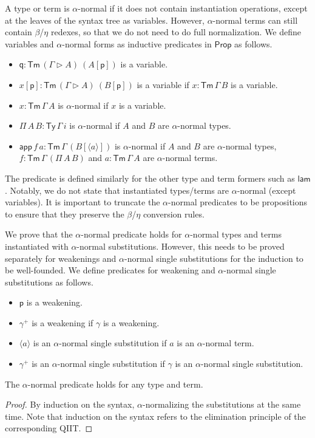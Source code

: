 \documentclass[sigplan,10pt,anonymous,review]{acmart}\settopmatter{printfolios=true,printccs=false,printacmref=false}
\newcommand{\Prop}{\mathsf{Prop}}
\newcommand{\Ty}{\mathsf{Ty}}
\newcommand{\Tm}{\mathsf{Tm}}
\newcommand{\p}{\mathsf{p}}
\newcommand{\q}{\mathsf{q}}
\newcommand{\ext}{\mathop{\triangleright}}
\newcommand{\lam}{\mathsf{lam}}
\newcommand{\app}{\mathsf{app}}
\begin{document}
A type or term is $\alpha$-normal if it does not contain instantiation
operations, except at the leaves of the syntax tree as variables. However,
$\alpha$-normal terms can still contain $\beta$/$\eta$ redexes, so that we do
not need to do full normalization. We define variables and $\alpha$-normal forms
as inductive predicates in $\Prop$ as follows.
\begin{itemize}
  \item $\q:\Tm\,(\Gamma\ext A)\ (A[\p])$ is a variable.
  \item $x[\p]:\Tm\,(\Gamma\ext A)\ (B[\p])$ is a variable if $x:\Tm\,\Gamma\,B$
  is a variable.
  \item $x:\Tm\,\Gamma\,A$ is $\alpha$-normal if $x$ is a variable.
  \item $\Pi\,A\,B:\Ty\,\Gamma\,i$ is $\alpha$-normal if $A$ and $B$ are
  $\alpha$-normal types.
  \item $\app\,f\,a:\Tm\,\Gamma\,(B[\langle a \rangle])$ is $\alpha$-normal if
  $A$ and $B$ are $\alpha$-normal types, $f:\Tm\,\Gamma\,(\Pi\,A\,B)$ and
  $a:\Tm\,\Gamma\,A$ are $\alpha$-normal terms.
\end{itemize}
The predicate is defined similarly for the other type and term formers such as $\lam$. Notably,
we do not state that instantiated types/terms are $\alpha$-normal (except variables). It is
important to truncate the $\alpha$-normal predicates to be propositions to
ensure that they preserve the $\beta$/$\eta$ conversion rules.

We prove that the $\alpha$-normal predicate holds for $\alpha$-normal types and
terms instantiated with $\alpha$-normal substitutions. However, this needs to be
proved separately for weakenings and $\alpha$-normal single substitutions for
the induction to be well-founded. We define predicates for weakening and
$\alpha$-normal single substitutions as follows.
\begin{itemize}
  \item $\p$ is a weakening.
  \item $\gamma^+$ is a weakening if $\gamma$ is a weakening.
  \item $\langle a \rangle$ is an $\alpha$-normal single substitution if $a$ is an
  $\alpha$-normal term.
  \item $\gamma^+$ is an $\alpha$-normal single substitution if $\gamma$ is an
  $\alpha$-normal single substitution.
\end{itemize}

\begin{lemma}
  \label{thm:alpha}
  The $\alpha$-normal predicate holds for any type and term.
\end{lemma}
\begin{proof}
  By induction on the syntax, $\alpha$-normalizing the substitutions
  at the same time. Note that induction on the syntax refers to the
  elimination principle of the corresponding QIIT.
\end{proof}
\end{document}
